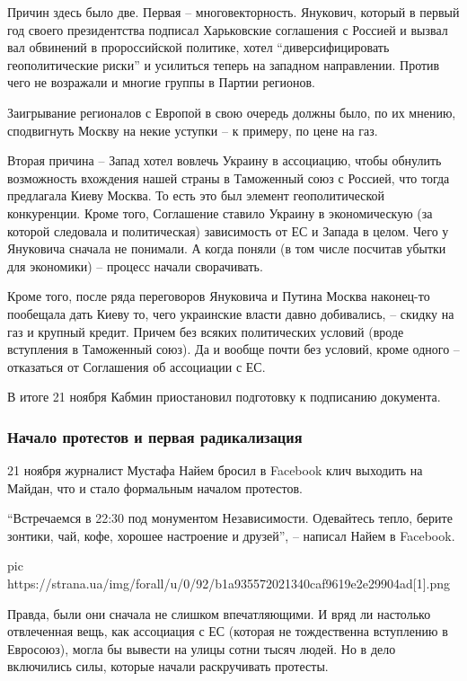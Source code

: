 Причин здесь было две. Первая – многовекторность. Янукович, который в первый
год своего президентства подписал Харьковские соглашения с Россией и вызвал вал
обвинений в пророссийской политике, хотел \enquote{диверсифицировать геополитические
риски} и усилиться теперь на западном направлении. Против чего не возражали и
многие группы в Партии регионов. 

Заигрывание регионалов с Европой в свою очередь должны было, по их мнению,
сподвигнуть Москву на некие уступки – к примеру, по цене на газ. 

Вторая причина – Запад хотел вовлечь Украину в ассоциацию, чтобы обнулить
возможность вхождения нашей страны в Таможенный союз с Россией, что тогда
предлагала Киеву Москва. То есть это был элемент геополитической
конкуренции. Кроме того, Соглашение ставило Украину в экономическую (за
которой следовала и политическая) зависимость от ЕС и Запада в целом. Чего
у Януковича сначала не понимали. А когда поняли (в том числе посчитав
убытки для экономики) – процесс начали сворачивать. 

Кроме того, после ряда переговоров Януковича и Путина Москва наконец-то
пообещала дать Киеву то, чего украинские власти давно добивались, – скидку
на газ и крупный кредит. Причем без всяких политических условий (вроде
вступления в Таможенный союз). Да и вообще почти без условий, кроме одного
– отказаться от Соглашения об ассоциации с ЕС.

В итоге 21 ноября Кабмин приостановил подготовку к подписанию документа. 

\subsubsection{Начало протестов и первая радикализация}

21 ноября журналист Мустафа Найем бросил в Facebook клич выходить на
Майдан, что и стало формальным началом протестов. 

\enquote{Встречаемся в 22:30 под монументом Независимости. Одевайтесь тепло,
берите зонтики, чай, кофе, хорошее настроение и друзей}, – написал Найем в
Facebook.

\ifcmt
pic https://strana.ua/img/forall/u/0/92/b1a935572021340caf9619e2e29904ad[1].png
\fi

Правда, были они сначала не слишком впечатляющими. И вряд ли настолько
отвлеченная вещь, как ассоциация с ЕС (которая не тождественна вступлению
в Евросоюз), могла бы вывести на улицы сотни тысяч людей. Но в дело
включились силы, которые начали раскручивать протесты. 

